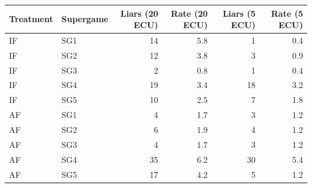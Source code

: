 \begin{tabular}{llrrrr}
  \toprule
  Treatment & Supergame & Liars (20 ECU) & Rate (20 ECU) & Liars (5 ECU) & Rate (5 ECU) \\ 
  \midrule
  IF & SG1 & 14 & 5.8 & 1 & 0.4 \\ 
  IF & SG2 & 12 & 3.8 & 3 & 0.9 \\ 
  IF & SG3 & 2 & 0.8 & 1 & 0.4 \\ 
  IF & SG4 & 19 & 3.4 & 18 & 3.2 \\ 
  IF & SG5 & 10 & 2.5 & 7 & 1.8 \\ 
  AF & SG1 & 4 & 1.7 & 3 & 1.2 \\ 
  AF & SG2 & 6 & 1.9 & 4 & 1.2 \\ 
  AF & SG3 & 4 & 1.7 & 3 & 1.2 \\ 
  AF & SG4 & 35 & 6.2 & 30 & 5.4 \\ 
  AF & SG5 & 17 & 4.2 & 5 & 1.2 \\ 
  \bottomrule
\end{tabular}
